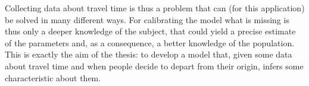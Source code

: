 Collecting data about travel time is thus a problem that can (for this application) be solved in many different ways.
For calibrating the model what is missing is thus only a deeper knowledge of the subject,
that could yield a precise estimate of the parameters and, as a consequence,
a better knowledge of the population.
This is exactly the aim of the thesis:
to develop a model that, given some data about travel time and when people decide to depart from their origin,
infers some characteristic about them.
